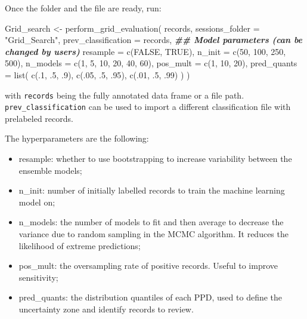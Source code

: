 \documentclass[
]{article}
\newenvironment{Shaded}{\begin{snugshade}}{\end{snugshade}}
\newcommand{\AttributeTok}[1]{\textcolor[rgb]{0.77,0.63,0.00}{#1}}
\newcommand{\ConstantTok}[1]{\textcolor[rgb]{0.00,0.00,0.00}{#1}}
\newcommand{\DecValTok}[1]{\textcolor[rgb]{0.00,0.00,0.81}{#1}}
\newcommand{\DocumentationTok}[1]{\textcolor[rgb]{0.56,0.35,0.01}{\textbf{\textit{#1}}}}
\newcommand{\FunctionTok}[1]{\textcolor[rgb]{0.00,0.00,0.00}{#1}}
\newcommand{\NormalTok}[1]{#1}
\newcommand{\OtherTok}[1]{\textcolor[rgb]{0.56,0.35,0.01}{#1}}
\newcommand{\StringTok}[1]{\textcolor[rgb]{0.31,0.60,0.02}{#1}}
\providecommand{\tightlist}{%
  \setlength{\itemsep}{0pt}\setlength{\parskip}{0pt}}
\begin{document}
Once the folder and the file are ready, run:

\begin{Shaded}
\begin{Highlighting}[]
\NormalTok{Grid\_search }\OtherTok{\textless{}{-}} \FunctionTok{perform\_grid\_evaluation}\NormalTok{(}
\NormalTok{  records,}
  \AttributeTok{sessions\_folder =} \StringTok{"Grid\_Search"}\NormalTok{,}
  \AttributeTok{prev\_classification =}\NormalTok{ records,}
  \DocumentationTok{\#\# Model parameters (can be changed by users)}
  \AttributeTok{resample =} \FunctionTok{c}\NormalTok{(}\ConstantTok{FALSE}\NormalTok{, }\ConstantTok{TRUE}\NormalTok{),}
  \AttributeTok{n\_init =} \FunctionTok{c}\NormalTok{(}\DecValTok{50}\NormalTok{, }\DecValTok{100}\NormalTok{, }\DecValTok{250}\NormalTok{, }\DecValTok{500}\NormalTok{),}
  \AttributeTok{n\_models =} \FunctionTok{c}\NormalTok{(}\DecValTok{1}\NormalTok{, }\DecValTok{5}\NormalTok{, }\DecValTok{10}\NormalTok{, }\DecValTok{20}\NormalTok{, }\DecValTok{40}\NormalTok{, }\DecValTok{60}\NormalTok{),}
  \AttributeTok{pos\_mult =} \FunctionTok{c}\NormalTok{(}\DecValTok{1}\NormalTok{, }\DecValTok{10}\NormalTok{, }\DecValTok{20}\NormalTok{),}
  \AttributeTok{pred\_quants =} \FunctionTok{list}\NormalTok{(}
    \FunctionTok{c}\NormalTok{(.}\DecValTok{1}\NormalTok{, .}\DecValTok{5}\NormalTok{, .}\DecValTok{9}\NormalTok{),}
    \FunctionTok{c}\NormalTok{(.}\DecValTok{05}\NormalTok{, .}\DecValTok{5}\NormalTok{, .}\DecValTok{95}\NormalTok{),}
    \FunctionTok{c}\NormalTok{(.}\DecValTok{01}\NormalTok{, .}\DecValTok{5}\NormalTok{, .}\DecValTok{99}\NormalTok{)}
\NormalTok{  )}
\NormalTok{)}
\end{Highlighting}
\end{Shaded}

with \texttt{records} being the fully annotated data frame or a file
path. \texttt{prev\_classification} can be used to import a different
classification file with prelabeled records.

The hyperparameters are the following:

\begin{itemize}
\tightlist
\item
  resample: whether to use bootstrapping to increase variability between
  the ensemble models;
\item
  n\_init: number of initially labelled records to train the machine
  learning model on;
\item
  n\_models: the number of models to fit and then average to decrease
  the variance due to random sampling in the MCMC algorithm. It reduces
  the likelihood of extreme predictions;
\item
  pos\_mult: the oversampling rate of positive records. Useful to
  improve sensitivity;
\item
  pred\_quants: the distribution quantiles of each PPD, used to define
  the uncertainty zone and identify records to review.
\end{itemize}
\end{document}
